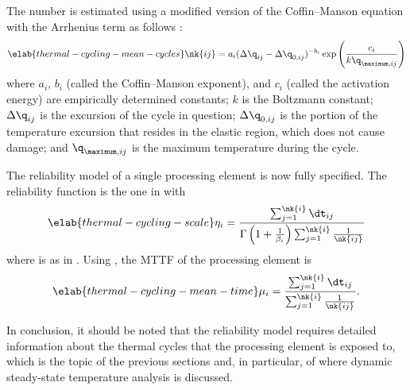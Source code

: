 The number  is estimated using a modified version of the Coffin--Manson
equation with the Arrhenius term as follows \cite{xiang2010, jedec2016}:
\begin{equation} \elab{thermal-cycling-mean-cycles}
  \nk{ij} = a_i (\Delta \q_{ij} - \Delta \q_{0, ij})^{-b_i} \exp\left(\frac{c_i}{k \q_{\maximum, ij}}\right)
\end{equation}
where $a_i$, $b_i$ (called the Coffin--Manson exponent), and $c_i$ (called the
activation energy) are empirically determined constants; $k$ is the Boltzmann
constant; $\Delta \q_{ij}$ is the excursion of the cycle in question; $\Delta
\q_{0, ij}$ is the portion of the temperature excursion that resides in the
elastic region, which does not cause damage; and $\q_{\maximum, ij}$ is the
maximum temperature during the cycle.

The reliability model of a single processing element is now fully specified. The
reliability function is the one in  with
\begin{equation} \elab{thermal-cycling-scale}
  \scale_i = \frac{\sum_{j = 1}^{\nk{i}} \dt_{ij}}{\Gamma\left(1 + \frac{1}{\shape_i}\right) \sum_{j = 1}^{\nk{i}} \frac{1}{\nk{ij}}}
\end{equation}
where  is as in . Using
, the \ac{MTTF} of the processing element is
\begin{equation} \elab{thermal-cycling-mean-time}
  \mean_i = \frac{\sum_{j = 1}^{\nk{i}} \dt_{ij}}{\sum_{j = 1}^{\nk{i}} \frac{1}{\nk{ij}}}.
\end{equation}

In conclusion, it should be noted that the reliability model requires detailed
information about the thermal cycles that the processing element is exposed to,
which is the topic of the previous sections and, in particular, of
 where dynamic steady-state temperature
analysis is discussed.
